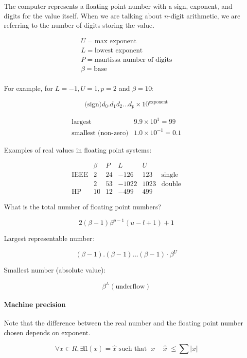 \documentclass[12pt]{article}
\newcommand{\abs}[1]{\left|#1\right|}
\newcommand{\<}{\langle}
\renewcommand{\>}{\rangle}
\begin{document}
The computer represents a floating point number with a sign, exponent, and digits for the value itself. When we are talking about $n$-digit arithmetic, we are referring to the number of digits storing the value.

\[
	\begin{matrix}
		U = \text{max exponent} \\
		L = \text{lowest exponent} \\
		P = \text{mantissa number of digits} \\
		\beta = \text{base} \\
	\end{matrix}
\]

For example, for $L=-1, U=1, p=2$ and $\beta = 10$:

\[
	\text{(sign)} d_0 . d_1 d_2 ... d_p \times 10^{\text{exponent}}
\]

\[
	\begin{matrix}
		\text{largest} & 9.9 \times 10^1 = 99\\
		\text{smallest (non-zero)} & 1.0 \times 10^{-1} = 0.1
	\end{matrix}
\]

Examples of real values in floating point systems:

\[
	\begin{matrix}
		& \beta & P & L & U \\
		\text{IEEE} & 2 & 24 & -126 & 123 & \text{single} \\
					& 2 & 53 & -1022 & 1023 & \text{double}\\ 
		\text{HP}   & 10 & 12 & -499 & 499
	\end{matrix}
\]

What is the total number of floating point numbers?

\[
	2(\beta - 1) \beta^{p-1} (u-l+1) + 1
\]

Largest representable number:

\[
	(\beta - 1).(\beta - 1)...(\beta - 1) \cdot \beta^U
\]

Smallest number (absolute value):

\[
	\beta^L (\text{underflow})
\]

\paragraph{Machine precision} Note that the difference between the real number and the floating point number chosen depends on exponent.

\[
	\forall x \in R, \exists \text{fl}(x) = \hat{x} \text{ such that } \abs{x-\hat{x}} \leq \sum \abs{x}
\]
\end{document}
